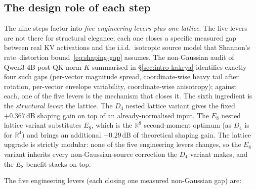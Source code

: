 \documentclass[10pt,a4paper]{article}
\theoremstyle{definition}
\theoremstyle{plain}
\newcommand{\R}{\mathbb{R}}
\begin{document}
\subsection{The design role of each step}
\label{sec:codec-why}

The nine steps factor into \emph{five engineering levers plus one
lattice}. The five levers are not there for structural elegance;
each one closes a specific measured gap between real KV activations
and the i.i.d.\ isotropic source model that Shannon's
rate--distortion bound~\eqref{eq:shaping-gap} assumes. The
non-Gaussian audit of Qwen3-4B post-QK-norm $K$ summarised in
\S\ref{sec:intro-kakeya} identifies exactly four such gaps (per-vector
magnitude spread, coordinate-wise heavy tail after rotation,
per-vector envelope variability, coordinate-wise anisotropy);
against each, one of the five levers is the mechanism that closes
it. The sixth ingredient is the \emph{structural lever}: the lattice.
The $D_4$ nested lattice variant gives the fixed $+0.367\,$dB
shaping gain on top of an already-normalised input. The $E_8$ nested
lattice variant substitutes $E_8$, which is the $\R^8$ second-moment
optimum (as $D_4$ is for $\R^4$) and brings an additional
$+0.29\,$dB of theoretical shaping gain. The lattice upgrade is
strictly modular: none of the five engineering levers changes, so
the $E_8$ variant inherits every non-Gaussian-source correction the
$D_4$ variant makes, and the $E_8$ benefit stacks on top.

The five engineering levers (each closing one measured
non-Gaussian gap) are:
\end{document}
